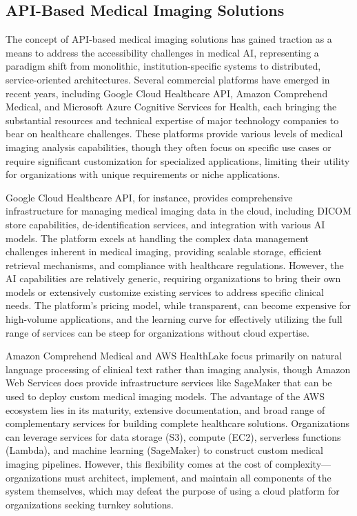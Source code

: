 \documentclass[12pt,a4paper]{article}
\begin{document}
\subsection{API-Based Medical Imaging Solutions}

The concept of API-based medical imaging solutions has gained traction as a means to address the accessibility challenges in medical AI, representing a paradigm shift from monolithic, institution-specific systems to distributed, service-oriented architectures. Several commercial platforms have emerged in recent years, including Google Cloud Healthcare API, Amazon Comprehend Medical, and Microsoft Azure Cognitive Services for Health, each bringing the substantial resources and technical expertise of major technology companies to bear on healthcare challenges. These platforms provide various levels of medical imaging analysis capabilities, though they often focus on specific use cases or require significant customization for specialized applications, limiting their utility for organizations with unique requirements or niche applications.

Google Cloud Healthcare API, for instance, provides comprehensive infrastructure for managing medical imaging data in the cloud, including DICOM store capabilities, de-identification services, and integration with various AI models. The platform excels at handling the complex data management challenges inherent in medical imaging, providing scalable storage, efficient retrieval mechanisms, and compliance with healthcare regulations. However, the AI capabilities are relatively generic, requiring organizations to bring their own models or extensively customize existing services to address specific clinical needs. The platform's pricing model, while transparent, can become expensive for high-volume applications, and the learning curve for effectively utilizing the full range of services can be steep for organizations without cloud expertise.

Amazon Comprehend Medical and AWS HealthLake focus primarily on natural language processing of clinical text rather than imaging analysis, though Amazon Web Services does provide infrastructure services like SageMaker that can be used to deploy custom medical imaging models. The advantage of the AWS ecosystem lies in its maturity, extensive documentation, and broad range of complementary services for building complete healthcare solutions. Organizations can leverage services for data storage (S3), compute (EC2), serverless functions (Lambda), and machine learning (SageMaker) to construct custom medical imaging pipelines. However, this flexibility comes at the cost of complexity—organizations must architect, implement, and maintain all components of the system themselves, which may defeat the purpose of using a cloud platform for organizations seeking turnkey solutions.
\end{document}
